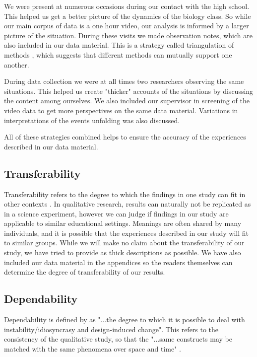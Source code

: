 We were present at numerous occasions during our contact with the high school. This helped us get a better picture of the dynamics of the biology class. So while our main corpus of data is a one hour video, our analysis is informed by a larger picture of the situation. During these visits we made observation notes, which are also included in our data material. This is a strategy called triangulation of methods \citep{baxter1997evaluating}, which suggests that different methods can mutually support one another. 

During data collection we were at all times two researchers observing the same situations. This helped us create "thicker" \citep{geertz1973interpretation} accounts of the situations by discussing the content among ourselves. We also included our supervisor in screening of the video data to get more perspectives on the same data material. Variations in interpretations of the events unfolding was also discussed.

All of these strategies combined helps to ensure the accuracy of the experiences described in our data material. 

\subsection{Transferability}
Transferability refers to the degree to which the findings in one study can fit in other contexts \citep{baxter1997evaluating}. In qualitative research, results can naturally not be replicated as in a science experiment, however we can judge if findings in our study are applicable to similar educational settings. Meanings are often shared by many individuals, and it is possible that the experiences described in our study will fit to similar groups. 
While we will make no claim about the transferability of our study, we have tried to provide as thick descriptions as possible. We have also included our data material in the appendices so the readers themselves can determine the degree of transferability of our results. 

\subsection{Dependability}
Dependability is defined by \citet{baxter1997evaluating} as "...the degree to which it is possible to deal with instability/idiosyncrasy and design-induced change". This refers to the consistency of the qualitative study, so that the "...same constructs may be matched with the same phenomena over space and time" \citep{baxter1997evaluating}. 

